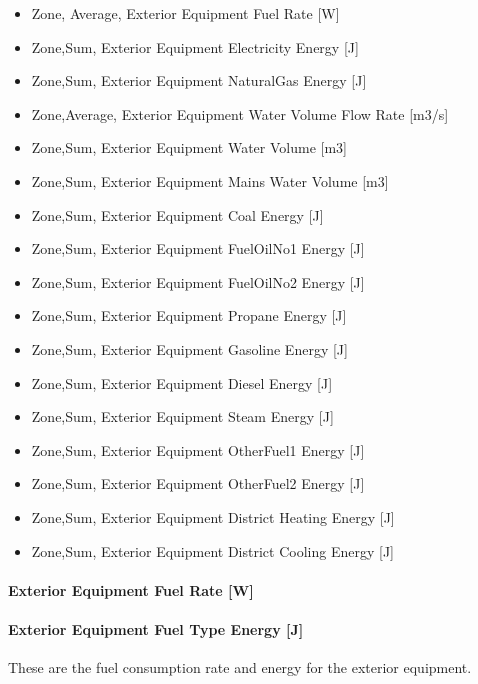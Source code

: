 \begin{itemize}
\item
  Zone, Average, Exterior Equipment Fuel Rate {[}W{]}
\item
  Zone,Sum, Exterior Equipment Electricity Energy {[}J{]}
\item
  Zone,Sum, Exterior Equipment NaturalGas Energy {[}J{]}
\item
  Zone,Average, Exterior Equipment Water Volume Flow Rate {[}m3/s{]}
\item
  Zone,Sum, Exterior Equipment Water Volume {[}m3{]}
\item
  Zone,Sum, Exterior Equipment Mains Water Volume {[}m3{]}
\item
  Zone,Sum, Exterior Equipment Coal Energy {[}J{]}
\item
  Zone,Sum, Exterior Equipment FuelOilNo1 Energy {[}J{]}
\item
  Zone,Sum, Exterior Equipment FuelOilNo2 Energy {[}J{]}
\item
  Zone,Sum, Exterior Equipment Propane Energy {[}J{]}
\item
  Zone,Sum, Exterior Equipment Gasoline Energy {[}J{]}
\item
  Zone,Sum, Exterior Equipment Diesel Energy {[}J{]}
\item
  Zone,Sum, Exterior Equipment Steam Energy {[}J{]}
\item
  Zone,Sum, Exterior Equipment OtherFuel1 Energy {[}J{]}
\item
  Zone,Sum, Exterior Equipment OtherFuel2 Energy {[}J{]}
\item
  Zone,Sum, Exterior Equipment District Heating Energy {[}J{]}
\item
  Zone,Sum, Exterior Equipment District Cooling Energy {[}J{]}
\end{itemize}

\paragraph{Exterior Equipment Fuel Rate {[}W{]}}\label{exterior-equipment-fuel-rate-w}

\paragraph{Exterior Equipment Fuel Type Energy {[}J{]}}\label{exterior-equipment-fuel-type-energy-j}

These are the fuel consumption rate and energy for the exterior equipment.

